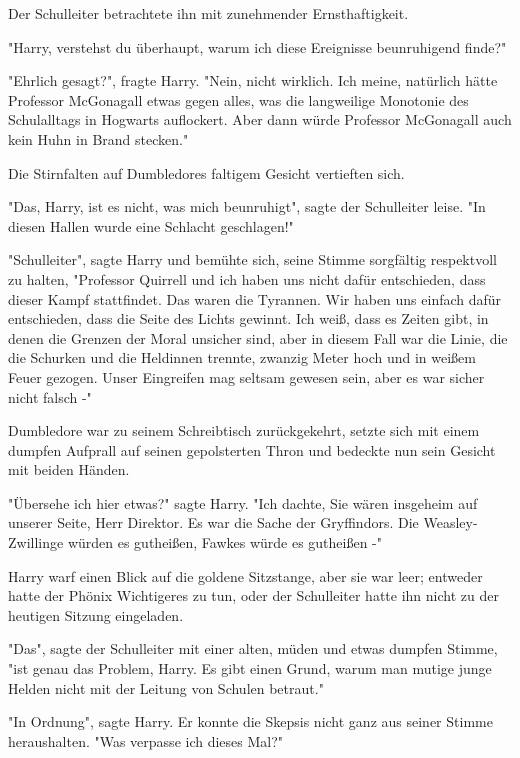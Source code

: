 {Der Schulleiter betrachtete ihn mit zunehmender Ernsthaftigkeit.

"Harry, verstehst du überhaupt, warum ich diese Ereignisse beunruhigend finde?"

"Ehrlich gesagt?", fragte Harry. "Nein, nicht wirklich. Ich meine, natürlich hätte Professor McGonagall etwas gegen alles, was die langweilige Monotonie des Schulalltags in Hogwarts auflockert. Aber dann würde Professor McGonagall auch kein Huhn in Brand stecken."

Die Stirnfalten auf Dumbledores faltigem Gesicht vertieften sich.

"Das, Harry, ist es nicht, was mich beunruhigt", sagte der Schulleiter leise. "In diesen Hallen wurde eine Schlacht geschlagen!"

"Schulleiter", sagte Harry und bemühte sich, seine Stimme sorgfältig respektvoll zu halten, "Professor Quirrell und ich haben uns nicht dafür entschieden, dass dieser Kampf stattfindet. Das waren die Tyrannen. Wir haben uns einfach dafür entschieden, dass die Seite des Lichts gewinnt. Ich weiß, dass es Zeiten gibt, in denen die Grenzen der Moral unsicher sind, aber in diesem Fall war die Linie, die die Schurken und die Heldinnen trennte, zwanzig Meter hoch und in weißem Feuer gezogen. Unser Eingreifen mag seltsam gewesen sein, aber es war sicher nicht falsch -"

Dumbledore war zu seinem Schreibtisch zurückgekehrt, setzte sich mit einem dumpfen Aufprall auf seinen gepolsterten Thron und bedeckte nun sein Gesicht mit beiden Händen.

"Übersehe ich hier etwas?" sagte Harry. "Ich dachte, Sie wären insgeheim auf unserer Seite, Herr Direktor. Es war die Sache der Gryffindors. Die Weasley-Zwillinge würden es gutheißen, Fawkes würde es gutheißen -"

Harry warf einen Blick auf die goldene Sitzstange, aber sie war leer; entweder hatte der Phönix Wichtigeres zu tun, oder der Schulleiter hatte ihn nicht zu der heutigen Sitzung eingeladen.

"Das", sagte der Schulleiter mit einer alten, müden und etwas dumpfen Stimme, "ist genau das Problem, Harry. Es gibt einen Grund, warum man mutige junge Helden nicht mit der Leitung von Schulen betraut."

"In Ordnung", sagte Harry. Er konnte die Skepsis nicht ganz aus seiner Stimme heraushalten. "Was verpasse ich dieses Mal?"

}
